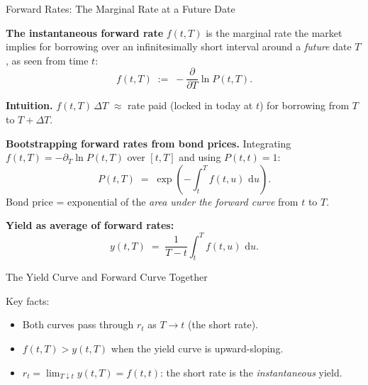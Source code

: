 \documentclass[compress]{beamer}
\newcommand{\dd}{\,\mathrm{d}}
\begin{document}
\begin{frame}{Forward Rates: The Marginal Rate at a Future Date}

\textbf{The instantaneous forward rate} $f(t,T)$ is the marginal rate the market implies for borrowing over an infinitesimally short interval around a \textit{future} date $T$, as seen from time $t$:
\[
	f(t,T) \;:=\; -\frac{\partial}{\partial T}\ln P(t,T).
\]

\medskip
\textbf{Intuition.}  $f(t,T)\,\Delta T$ $\approx$ rate paid (locked in today at $t$) for borrowing from $T$ to $T+\Delta T$.

\medskip
\textbf{Bootstrapping forward rates from bond prices.}
Integrating $f(t,T) = -\partial_T \ln P(t,T)$ over $[t,T]$ and using $P(t,t) = 1$:
\[
	\boxed{P(t,T) \;=\; \exp\!\left(-\int_t^T f(t,u)\,\dd u\right).}
\]
Bond price = exponential of the \textit{area under the forward curve} from $t$ to $T$.

\medskip
\textbf{Yield as average of forward rates:}
\[
	y(t,T) \;=\; \frac{1}{T-t}\int_t^T f(t,u)\,\dd u.
\]

\end{frame}

\begin{frame}{The Yield Curve and Forward Curve Together}

\begin{center}
\end{center}

\medskip
Key facts:
\begin{itemize}
	\item Both curves pass through $r_t$ as $T \to t$ (the short rate).
	\item $f(t,T) > y(t,T)$ when the yield curve is upward-sloping.
	\item $r_t = \lim_{T\downarrow t} y(t,T) = f(t,t)$: the short rate is the \textit{instantaneous} yield.
\end{itemize}

\end{frame}
\end{document}
